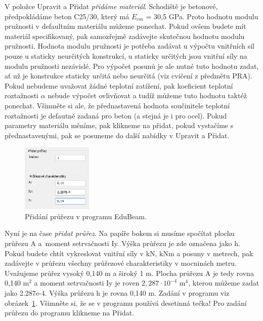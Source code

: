 \documentclass[12pt,fleqn]{article}
\begin{document}
V položce Upravit a Přidat \emph{přidáme materiál}. Schodiště je betonové, předpokládáme beton C25/30, který má $E_{cm}$ = 30,5 GPa. Proto hodnotu modulu pružnosti v defaultním materiálu můžeme ponechat. Pokud ovšem budete mít materiál specifikovaný, pak samozřejmě zadávejte skutečnou hodnotu modulu pružnosti. Hodnota modulu pružnosti je potřeba zadávat u výpočtu vnitřních sil pouze u staticky neurčitých konstrukcí, u staticky určitých jsou vnitřní síly na modulu pružnosti nezávislé. Pro výpočet posunů je ale nutné tuto hodnotu zadat, ať už je konstrukce staticky určitá nebo neurčitá (viz cvičení z předmětu PRA). Pokud nebudeme uvažovat žádné teplotní zatížení, pak koeficient teplotní roztažnosti $\alpha$ nebude výpočet ovlivňovat a tudíž můžeme tuto hodnotu taktéž ponechat. Všimněte si ale, že přednastavená hodnota součinitele teplotní roztažnosti je defautně zadaná pro beton (a stejná je i pro ocel). Pokud parametry materiálu měníme, pak klikneme na přidat, pokud vystačíme s přednastavenými, pak se posuneme do další nabídky v Upravit a Přidat.

\begin{figure}
\begin{center}
\includegraphics[width=0.3\textwidth]{figs/eduBeam_prurez.png}\caption{Přidání průřezu v programu EduBeam.}\label{fig:EduBeam_pridatprurez}
\end{center}
\end{figure}
Nyní je na čase \emph{přidat průřez}. Na papíře bokem si musíme spočítat plochu průřezu A a~moment setrvačnosti Iy. Výška průřezu je zde označena jako h. Pokud budete chtít vykreslovat vnitřní síly v kN, kNm a posuny v metrech, pak zadávejte v průřezu všechny průřezové charakteristiky v mocninách metru. Uvažujeme průřez vysoký 0,140 m a široký 1 m. Plocha průřezu A je tedy rovna 0,140 m$^2$ a moment setrvačnosti Iy je roven $2,287 \cdot 10^{-4}$ m$^4$, kterou můžeme zadat jako 2.287e-4. Výška průřezu h je rovna 0,140 m. Zadání v programu viz obrázek~\ref{fig:EduBeam_pridatprurez}. Všimněte si, že se v programu používá desetinná tečka! Pro zadání průřezu do programu klikneme na Přidat.
\end{document}
